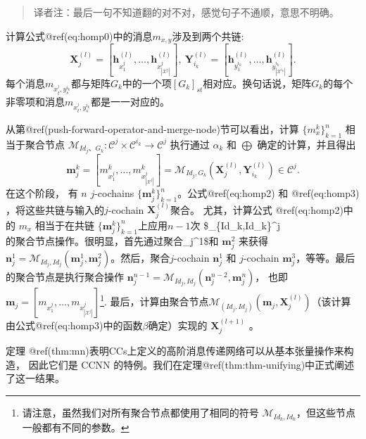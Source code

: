 \documentclass[
  12pt,
]{krantz}
\begin{document}
\begin{quote}
译者注：最后一句不知道翻的对不对，感觉句子不通顺，意思不明确。
\end{quote}

计算公式@ref(eq:homp0)中的消息\(m_{x,y}\)涉及到两个共链:
\begin{equation*}
        \mathbf{X}_j^{(l)}=
        [\mathbf{h}_{x^j_1}^{(l)},\ldots,\mathbf{h}_{x^j_{|\mathcal{X}^j|}}^{(l)}],~
        \mathbf{Y}_{i_k}^{(l)}=
        [\mathbf{h}_{y^{i_k}_1}^{(l)},\ldots,\mathbf{h}_{y^{i_k}_{|\mathcal{X}^{i_k}|}}^{(l)}].
    \end{equation*}
每个消息\(m_{x^{^j}_t, y^{i_k}_s }\)都与矩阵\(G_k\)中的一个项\([G_k]_{st}\)相对应。换句话说，矩阵\(G_k\)的每个非零项和消息\(m_{x^{^j}_t, y^{i_k}_s }\)都是一一对应的。

从第@ref(push-forward-operator-and-merge-node)节可以看出，计算
\(\{m_x^k\}_{k=1}^n\) 相当于聚合节点
\(\mathcal{M}_{Id_j、 G_k}\colon \mathcal{C}^j\times \mathcal{C}^{i_k}\to \mathcal{C}^j\)
执行通过 \(\alpha_k\) 和 \(\bigoplus\) 确定的计算，并且得出
\begin{equation*}
        \mathbf{m}_j^k=[m_{x^j_1}^k,\ldots,m_{x^j_{|\mathcal{X}^j|}}^k]=
        \mathcal{M}_{Id_j,G_k}(\mathbf{X}_j^{(l)},\mathbf{Y}_{i_k}^{(l)}) \in \mathcal{C}^{j}.
    \end{equation*} 在这个阶段， 有 \(n\) \(j\)-cochains
\(\{\mathbf{m}_j^k\}_{k=1}^n\)。公式@ref(eq:homp2) 和 @ref(eq:homp3)
，将这些共链与输入的\(j\)-cochain \(\mathbf{X}_j^{(l)}\)聚合。
尤其，计算公式 @ref(eq:homp2)中的 \(m_x\) 相当于在共链
\(\{\mathbf{m}_j^k\}_{k=1}^n\)上应用\(n-1\)次
\$\_\{Id\_k,Id\_k\}\colon{}\^{}j
\(的聚合节点操作。 很明显，首先通过聚合\)\_j\^{}1\$和
\(\mathbf{m}_j^2\) 来获得
\(\mathbf{n}_j^1=\mathcal{M}_{Id_j,Id_j}(\mathbf{m}_j^1,\mathbf{m}_j^2)\)。然后，聚合\(j\)-cochain
\(\mathbf{n}_j^1\) 和 \(j\)-cochain
\(\mathbf{m}_j^3\)，等等。最后的聚合节点是执行聚合操作
\(\mathbf{n}_j^{n-1}=\mathcal{M}_{Id_j,Id_j}(\mathbf{n}_j^{n-2},\mathbf{m}_j^n)\)，
也即
\(\mathbf{m}_j = [ m_{x_1^j},\ldots, m_{x_{|\mathcal{X}^j|}^j }]\)\footnote{请注意，虽然我们对所有聚合节点都使用了相同的符号
  \(\mathcal{M}_{Id_k,Id_k}\)，但这些节点一般都有不同的参数。}.
最后，计算由聚合节点\(\mathcal{M}_{(Id_j,Id_j)}(\mathbf{m}_j, \mathbf{X}_j^{(l)})\)（该计算由公式@ref(eq:homp3)中的函数\(\beta\)确定）实现的
\(\mathbf{X}_j^{(l+1)}\) 。

定理
@ref(thm:mn)表明CCs上定义的高阶消息传递网络可以从基本张量操作来构造，
因此它们是 CCNN
的特例。我们在定理@ref(thm:thm-unifying)中正式阐述了这一结果。
\end{document}
